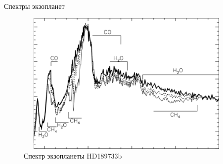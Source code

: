 \documentclass[
]{beamer}
\begin{document}
	\begin{frame}{Спектры экзопланет}
		\begin{figure}[H]
			\centering
			\includegraphics[width=11cm, height=7cm]{last.png}
			\caption{Спектр экзопланеты HD189733b}
		\end{figure}
	\end{frame}
\end{document}
